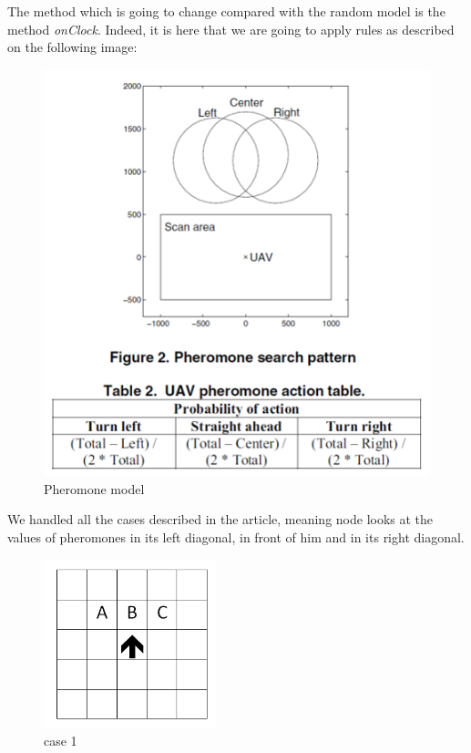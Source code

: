 The method which is going to change compared with the random model is the method \textit{onClock}. Indeed, it is here that we are going to apply rules as described on the following image:

\newpage

\begin{figure}[!h]
\center
\includegraphics{../images/pheromon_model.png}
\caption{Pheromone model}
\end{figure}

We handled all the cases described in the article, meaning node looks at the values of pheromones in its left diagonal, in front of him and in its right diagonal.

\newpage

\begin{figure}[!h]
\center
\includegraphics[width=5cm]{../images/grille_case_1.png}
\caption{\label{case1}case 1}
\end{figure}

